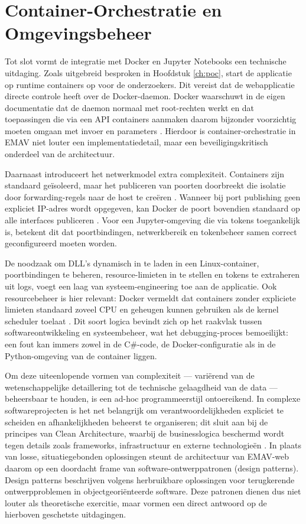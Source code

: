 \section{Container-Orchestratie en Omgevingsbeheer}
Tot slot vormt de integratie met Docker en Jupyter Notebooks een technische uitdaging. Zoals uitgebreid besproken in Hoofdstuk \ref{ch:poc}, start de applicatie op runtime containers op voor de onderzoekers. Dit vereist dat de webapplicatie directe controle heeft over de Docker-daemon. Docker waarschuwt in de eigen documentatie dat de daemon normaal met root-rechten werkt en dat toepassingen die via een API containers aanmaken daarom bijzonder voorzichtig moeten omgaan met invoer en parameters \autocite{dockerEngineSecurity}. Hierdoor is container-orchestratie in EMAV niet louter een implementatiedetail, maar een beveiligingskritisch onderdeel van de architectuur.

Daarnaast introduceert het netwerkmodel extra complexiteit. Containers zijn standaard geïsoleerd, maar het publiceren van poorten doorbreekt die isolatie door forwarding-regels naar de host te creëren \autocite{dockerPublishingPorts}. Wanneer bij port publishing geen expliciet IP-adres wordt opgegeven, kan Docker de poort bovendien standaard op alle interfaces publiceren \autocite{dockerRunReference}. Voor een Jupyter-omgeving die via tokens toegankelijk is, betekent dit dat poortbindingen, netwerkbereik en tokenbeheer samen correct geconfigureerd moeten worden.

De noodzaak om DLL's dynamisch in te laden in een Linux-container, poortbindingen te beheren, resource-limieten in te stellen en tokens te extraheren uit logs, voegt een laag van systeem-engineering toe aan de applicatie. Ook resourcebeheer is hier relevant: Docker vermeldt dat containers zonder expliciete limieten standaard zoveel CPU en geheugen kunnen gebruiken als de kernel scheduler toelaat \autocite{dockerResourceConstraints}. Dit soort logica bevindt zich op het raakvlak tussen softwareontwikkeling en systeembeheer, wat het debugging-proces bemoeilijkt: een fout kan immers zowel in de C\#-code, de Docker-configuratie als in de Python-omgeving van de container liggen.

{\sloppy Om deze uiteenlopende vormen van complexiteit — variërend van de wetenschappelijke detaillering tot de technische gelaagdheid van de data — beheersbaar te houden, is een ad-hoc programmeerstijl ontoereikend. In complexe softwareprojecten is het net belangrijk om verantwoordelijkheden expliciet te scheiden en afhankelijkheden beheerst te organiseren; dit sluit aan bij de principes van Clean Architecture, waarbij de businesslogica beschermd wordt tegen details zoals frameworks, infrastructuur en externe technologieën \autocite{martin2017clean}. In plaats van losse, situatiegebonden oplossingen steunt de architectuur van EMAV-web daarom op een doordacht frame van software-ontwerppatronen (design patterns). Design patterns beschrijven volgens \textcite{gof1994} herbruikbare oplossingen voor terugkerende ontwerpproblemen in objectgeoriënteerde software. Deze patronen dienen dus niet louter als theoretische exercitie, maar vormen een direct antwoord op de hierboven geschetste uitdagingen.\par}

